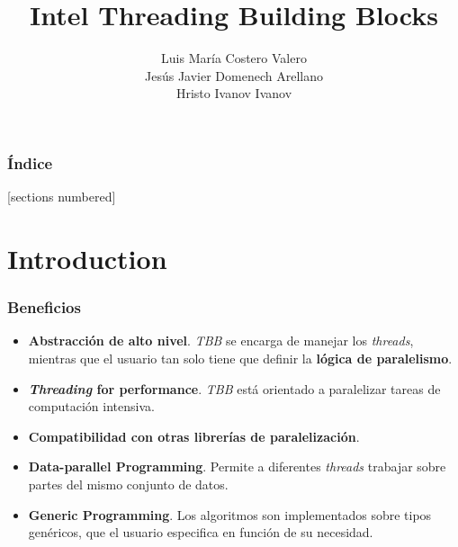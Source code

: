 \documentclass[10pt]{beamer}
\title{Intel Threading Building Blocks}
\date{}%
\author{Luis María Costero Valero\\Jesús Javier Domenech Arellano\\Hristo
  Ivanov Ivanov}
\institute{23 Noviembre 2015}
\begin{document}
\maketitle


\begin{frame}
  \frametitle{Índice}
  [sections numbered]
  \tableofcontents[hideallsubsections]
\end{frame}

\section{Introduction} %


\begin{frame}
  \frametitle{Beneficios}
  \begin{itemize}
    \item \textbf{Abstracción de alto nivel}. \emph{TBB} se encarga de
          manejar los \emph{threads}, mientras que el usuario tan solo
          tiene que definir la \textbf{lógica de paralelismo}.
    \item \textbf{\emph{Threading} for performance}. \emph{TBB} está orientado
          a paralelizar tareas de computación intensiva.
    \item \textbf{Compatibilidad con otras librerías de paralelización}.
    \item \textbf{Data-parallel Programming}. Permite a diferentes
          \emph{threads} trabajar sobre partes del mismo conjunto de datos.
    \item \textbf{Generic Programming}. Los algoritmos son implementados
          sobre tipos genéricos, que el usuario especifica en función
          de su necesidad.
  \end{itemize}
\end{frame}
\end{document}

